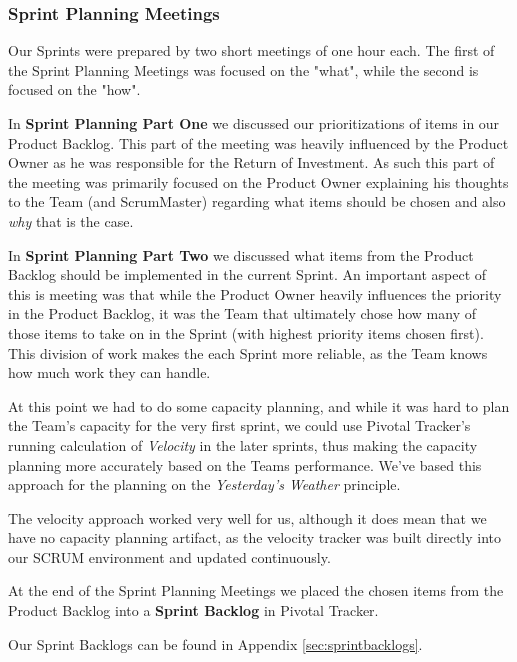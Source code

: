 \subsubsection{Sprint Planning Meetings} 
Our Sprints were prepared by two short meetings of one hour each. The first of the Sprint Planning Meetings was focused on the "what", while the second is focused on the "how".

In \textbf{Sprint Planning Part One}  we discussed our prioritizations of items in our Product Backlog. This part of the meeting was heavily influenced by the Product Owner as he was responsible for the Return of Investment. As such this part of the meeting was primarily focused on the Product Owner explaining his thoughts to the Team (and ScrumMaster) regarding what items should be chosen and also \textit{why} that is the case.

In \textbf{Sprint Planning Part Two} we discussed what items from the Product Backlog should be implemented in the current Sprint. An important aspect of this is meeting was that while the Product Owner heavily influences the priority in the Product Backlog, it was the Team that ultimately chose how many of those items to take on in the Sprint (with highest priority items chosen first). This division of work makes the each Sprint more reliable, as the Team knows how much work they can handle.

At this point we had to do some capacity planning, and while it was hard to plan the Team's capacity for the very first sprint, we could use Pivotal Tracker's running calculation of \textit{Velocity} in the later sprints, thus making the capacity planning more accurately based on the Teams performance. We've based this approach for the planning on the \textit{Yesterday's Weather} principle\cite{fowleryesterday}.

The velocity approach worked very well for us, although it does mean that we have no capacity planning artifact, as the velocity tracker was built directly into our SCRUM environment and updated continuously.

At the end of the Sprint Planning Meetings we placed the chosen items from the Product Backlog into a \textbf{Sprint Backlog} in Pivotal Tracker.

Our Sprint Backlogs can be found in Appendix \ref{sec:sprintbacklogs}.